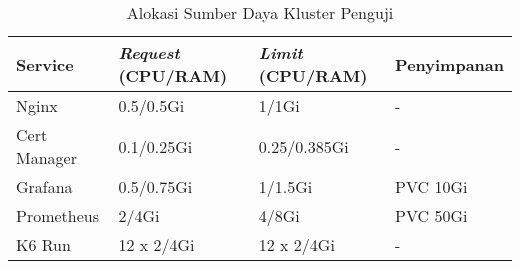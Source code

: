 \begin{table}[H]
    \centering
    \caption{Alokasi Sumber Daya Kluster Penguji}
    \label{tab:test-cluster-allocation}
    \begin{tabular}{|l|l|l|l|}
        \hline
        \textbf{Service} & \textbf{\textit{Request} (CPU/RAM)} & \textbf{\textit{Limit} (CPU/RAM)} & \textbf{Penyimpanan} \\ \hline
        Nginx            & 0.5/0.5Gi                           & 1/1Gi                             & -                    \\ \hline
        Cert Manager     & 0.1/0.25Gi                          & 0.25/0.385Gi                      & -                    \\ \hline
        Grafana          & 0.5/0.75Gi                          & 1/1.5Gi                           & PVC 10Gi             \\ \hline
        Prometheus       & 2/4Gi                               & 4/8Gi                             & PVC 50Gi             \\ \hline
        K6 Run           & 12 x 2/4Gi                          & 12 x 2/4Gi                        & -                    \\ \hline
    \end{tabular}
\end{table}

